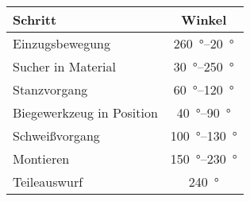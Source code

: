 

\renewcommand{\arraystretch}{1.7}


\begin{tabular}{lc}\toprule
Schritt & Winkel \\
\midrule
\rowcolor{red} 
Einzugsbewegung & \SIrange{260}{20}{\degree} \\
\rowcolor{brown} 
Sucher in Material & \SIrange{30}{250}{\degree} \\
\rowcolor{yellow} 
Stanzvorgang & \SIrange{60}{120}{\degree} \\
\rowcolor{magenta} 
Biegewerkzeug in Position & \SIrange{40}{90}{\degree} \\
\rowcolor{violet} 
Schweißvorgang & \SIrange{100}{130}{\degree} \\
\rowcolor{green} 
Montieren & \SIrange{150}{230}{\degree} \\
\rowcolor{cyan} 
Teileauswurf & \SI{240}{\degree} \\
\bottomrule
\end{tabular}


\begin{comment}
\renewcommand{\arraystretch}{1.7}

\sisetup{range-phrase= - , range-units=single}

\begin{tabular}{lc}\toprule
Schritt & Winkel \\
\midrule
\rowcolor{Colour1} 
Einzugsbewegung & \SIrange{260}{20}{\degree} \\
\rowcolor{Colour2} 
Sucher in Material & \SIrange{30}{250}{\degree} \\
\rowcolor{Colour3} 
Stanzvorgang & \SIrange{60}{120}{\degree} \\
\rowcolor{Colour4} 
Biegewerkzeug in Position & \SIrange{40}{90}{\degree} \\
\rowcolor{Colour5} 
Schweißvorgang & \SIrange{100}{130}{\degree} \\
\rowcolor{Colour6} 
Montieren & \SIrange{150}{230}{\degree} \\
\rowcolor{Colour7} 
Teileauswurf & \SI{240}{\degree} \\
\bottomrule
\end{tabular}
\end{comment}